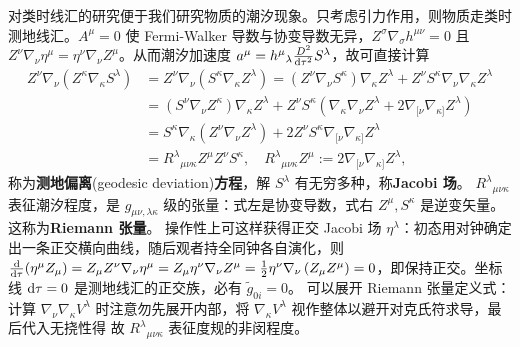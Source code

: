 对类时线汇的研究便于我们研究物质的潮汐现象。只考虑引力作用，则物质走类时测地线汇。$A^\mu=0$ 使 Fermi-Walker 导数与协变导数无异，$Z^\sigma\nabla_\sigma h^{\mu\nu}=0$ 且 $Z^\nu\nabla_\nu \eta^\mu = \eta^\nu\nabla_\nu Z^\mu$。从而潮汐加速度 $a^\mu = h^\mu{}_\lambda\frac{D^2}{\dd\tau^2}S^\lambda$，故可直接计算
\begin{align}
    Z^\nu \nabla_\nu(Z^\kappa \nabla_\kappa S^\lambda)&= Z^\nu \nabla_\nu\left(S^\kappa\nabla_\kappa Z^\lambda\right) = \left(Z^\nu \nabla_\nu S^\kappa\right)\nabla_\kappa Z^\lambda+Z^\nu S^\kappa \nabla_\nu \nabla_\kappa Z^\lambda\nonumber\\
    &= \left(S^\nu \nabla_\nu Z^\kappa\right)\nabla_\kappa Z^\lambda+Z^\nu S^\kappa\left(\nabla_\kappa \nabla_\nu Z^\lambda+2\nabla_{[\nu}\nabla_{\kappa]}Z^\lambda\right)\nonumber\\
    &=S^\kappa\nabla_\kappa\left(Z^\nu \nabla_\nu Z^\lambda\right) +2Z^\nu S^\kappa\nabla_{[\nu}\nabla_{\kappa]}Z^\lambda\nonumber\\
    &=R^\lambda{}_{\mu\nu\kappa}  Z^\mu  Z^\nu S^\kappa,\quad R^\lambda{}_{\mu\nu\kappa}Z^\mu:= 2\nabla_{[\nu}\nabla_{\kappa]}Z^\lambda,
\end{align}
称为\textbf{测地偏离}(geodesic deviation)\textbf{方程}，解 $S^\lambda$ 有无穷多种，称\textbf{Jacobi 场}。
$R^\lambda{}_{\mu\nu\kappa}$ 表征潮汐程度，是 $g_{\mu\nu,\lambda\kappa}$ 级的张量：式左是协变导数，式右 $Z^\mu,S^\kappa$ 是逆变矢量。这称为\textbf{Riemann 张量}。
操作性上可这样获得正交 Jacobi 场 $\eta^\lambda$：初态用对钟确定出一条正交横向曲线，随后观者持全同钟各自演化，则 $\dv{\tau} (\eta^\mu Z_\mu ) =Z_\mu Z^\nu \nabla_\nu \eta^\mu=Z_\mu \eta^\nu \nabla_\nu Z^\mu=\frac{1}{2} \eta^\nu \nabla_\nu\left(Z_\mu Z^\mu\right)=0$，即保持正交。坐标线 $\dd\tau = 0$ 是测地线汇的正交族，必有 $\tilde g_{0i} = 0$。
可以展开 Riemann 张量定义式：计算 $\nabla_\nu\nabla_\kappa V^\lambda$ 时注意勿先展开内部，将 $\nabla_\kappa V^\lambda$ 视作整体以避开对克氏符求导，最后代入无挠性得
故 $R^\lambda{}_{\mu\nu\kappa}$ 表征度规的非闵程度。

